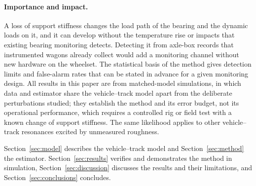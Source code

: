 \paragraph{Importance and impact.} A loss of support stiffness changes the load path of the bearing and
the dynamic loads on it, and it can develop without the temperature rise or impacts that existing
bearing monitoring detects. Detecting it from axle-box records that instrumented wagons already collect
would add a monitoring channel without new hardware on the wheelset. The statistical basis of the method
gives detection limits and false-alarm rates that can be stated in advance for a given monitoring
design. All results in this paper are from matched-model simulations, in which data and estimator share
the vehicle--track model apart from the deliberate perturbations studied; they establish the method and
its error budget, not its operational performance, which requires a controlled rig or field test with a
known change of support stiffness. The same likelihood applies to other vehicle--track resonances excited
by unmeasured roughness.

Section~\ref{sec:model} describes the vehicle--track model and Section~\ref{sec:method} the
estimator. Section~\ref{sec:results} verifies and demonstrates the method in simulation,
Section~\ref{sec:discussion} discusses the results and their limitations, and
Section~\ref{sec:conclusions} concludes.
